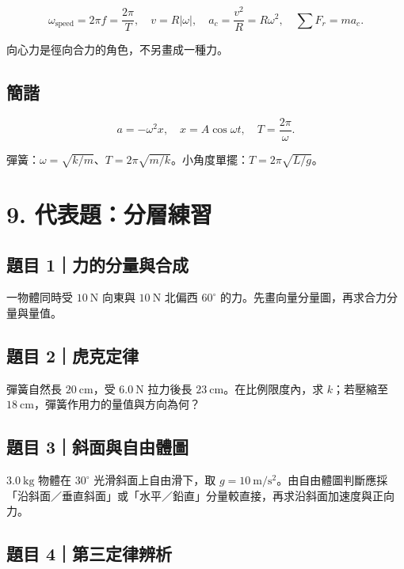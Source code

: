 \documentclass[11pt,a4paper]{article}
\begin{document}
\[
\omega_{\mathrm{speed}}=2\pi f=\frac{2\pi}{T},
\quad
v=R|\omega|,
\quad
a_c=\frac{v^2}{R}=R\omega^2,
\quad
\sum F_r=ma_c.
\]

向心力是徑向合力的角色，不另畫成一種力。

\subsection{簡諧}\label{ux7c21ux8ae7}

\[
a=-\omega^2x,
\quad
x=A\cos\omega t,
\quad
T=\frac{2\pi}{\omega}.
\]

彈簧：\(\omega=\sqrt{k/m}\)、\(T=2\pi\sqrt{m/k}\)。小角度單擺：\(T=2\pi\sqrt{L/g}\)。

\section{9. 代表題：分層練習}\label{ux4ee3ux8868ux984cux5206ux5c64ux7df4ux7fd2}

\subsection{題目 1｜力的分量與合成}\label{ux984cux76ee-1ux529bux7684ux5206ux91cfux8207ux5408ux6210}

一物體同時受 \(10\ \mathrm N\) 向東與 \(10\ \mathrm N\) 北偏西 \(60^\circ\) 的力。先畫向量分量圖，再求合力分量與量值。

\subsection{題目 2｜虎克定律}\label{ux984cux76ee-2ux864eux514bux5b9aux5f8b}

彈簧自然長 \(20\ \mathrm{cm}\)，受 \(6.0\ \mathrm N\) 拉力後長 \(23\ \mathrm{cm}\)。在比例限度內，求 \(k\)；若壓縮至 \(18\ \mathrm{cm}\)，彈簧作用力的量值與方向為何？

\subsection{題目 3｜斜面與自由體圖}\label{ux984cux76ee-3ux659cux9762ux8207ux81eaux7531ux9ad4ux5716}

\(3.0\ \mathrm{kg}\) 物體在 \(30^\circ\) 光滑斜面上自由滑下，取 \(g=10\ \mathrm{m/s^2}\)。由自由體圖判斷應採「沿斜面／垂直斜面」或「水平／鉛直」分量較直接，再求沿斜面加速度與正向力。

\subsection{題目 4｜第三定律辨析}\label{ux984cux76ee-4ux7b2cux4e09ux5b9aux5f8bux8fa8ux6790}
\end{document}
